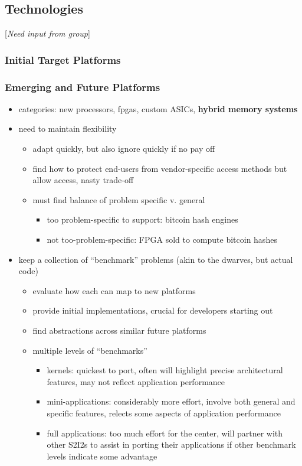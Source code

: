 \subsection{Technologies} [\textit{Need input from group}]
\subsubsection{Initial Target Platforms}

\subsubsection{Emerging and Future Platforms}

\begin{itemize}
\item categories: new processors, fpgas, custom ASICs, \textbf{hybrid memory systems}
\item need to maintain flexibility
  \begin{itemize}
  \item adapt quickly, but also ignore quickly if no pay off
  \item find how to protect end-users from vendor-specific access methods but allow access, nasty trade-off
  \item must find balance of problem specific v. general
    \begin{itemize}
    \item too problem-specific to support: bitcoin hash engines
    \item not too-problem-specific: FPGA sold to compute bitcoin hashes
    \end{itemize}
  \end{itemize}
\item keep a collection of ``benchmark'' problems (akin to the dwarves, but actual code)
  \begin{itemize}
  \item evaluate how each can map to new platforms
  \item provide initial implementations, crucial for developers starting out
  \item find abstractions across similar future platforms
  \item multiple levels of ``benchmarks''
    \begin{itemize}
    \item kernels: quickest to port, often will highlight precise architectural features, may not reflect application performance
    \item mini-applications: considerably more effort, involve both general and specific features, relects some aspects of application performance
    \item full applications: too much effort for the center, will partner with other S2I2s to assist in porting their applications if other benchmark levels indicate some advantage
    \end{itemize}
  \end{itemize}
\end{itemize}

